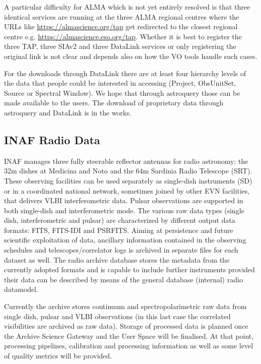 \documentclass[11pt,a4paper]{ivoa}
\begin{document}
A particular difficulty for ALMA which is not yet entirely resolved is that three identical services are running at the three ALMA regional centres where the URLs like \url{https://almascience.org/tap} get redirected
to the closest regional centre e.g. \url{https://almascience.eso.org/tap}.
Whether it is best to register the three TAP, three SIAv2 and three DataLink services or only registering the original link is not clear and
depends also on how the VO tools handle such cases.

For the downloads through DataLink there are at least four hierarchy
levels of the data that people could be interested in accessing (Project, ObsUnitSet, Source or Spectral Window). We hope that through astroquery those can be made available to the users. The download of proprietary data through astroquery and DataLink is in
the works.

\subsection{INAF Radio Data}
\label{sec:INAF}
INAF manages three fully steerable reflector antennas for radio astronomy: the 32m dishes at Medicina and Noto and the 64m Sardinia Radio Telescope (SRT). These observing facilities can be used separately as single-dish instruments (SD) or in a coordinated national network, sometimes joined by other EVN facilities, that delivers VLBI interferometric data. Pulsar observations are supported in both single-dish and interferometric mode. The various raw data types (single dish, interferometric and pulsar) are characterized by different output data formats: FITS, FITS-IDI and PSRFITS. Aiming at persistence and future scientific exploitation of data, ancillary information contained in the observing schedules and telescopes/correlator logs is archived in separate files for each dataset as well. The radio archive database stores the metadata from the currently adopted formats and is capable to include further instruments provided their data can be described by means of the general database (internal) radio datamodel.

Currently the archive stores continuum and spectropolarimetric raw data from single dish, pulsar and VLBI observations (in this last case the correlated visibilities are archived as raw data). Storage of processed data is planned once the Archive Science Gateway and the User Space will be finalised. At that point, processing pipelines, calibration and processing information as well as some level of quality metrics will be provided.
\end{document}

